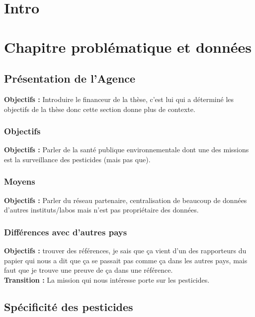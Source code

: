 \documentclass[12pt, twoside]{report}
\begin{document}
\dominitoc
\tableofcontents								     

\chapter{Intro}

\chapter{Chapitre problématique et données}



\section{Présentation de l'Agence}

\textbf{Objectifs :} Introduire le financeur de la thèse, c'est lui qui a déterminé les objectifs de la thèse donc cette section donne plus de contexte.  

\subsection{Objectifs}

\textbf{Objectifs :} Parler de la santé publique environnementale dont une des missions est la surveillance des pesticides (mais pas que).  

\subsection{Moyens}

\textbf{Objectifs :} Parler du réseau partenaire, centralisation de beaucoup de données d'autres instituts/labos mais n'est pas propriétaire des données.   

\subsection{Différences avec d'autres pays}

\textbf{Objectifs :} trouver des références, je sais que ça vient d'un des rapporteurs du papier qui nous a dit que ça se passait pas comme ça dans les autres pays, mais faut que je trouve une preuve de ça dans une référence. \\

\textbf{Transition :} La mission qui nous intéresse porte sur les pesticides.

\section{Spécificité des pesticides}
\end{document}
